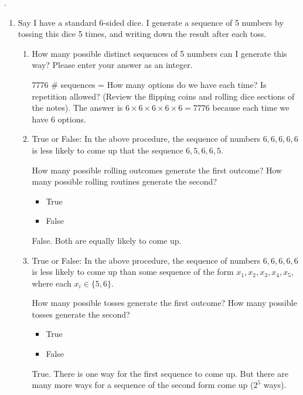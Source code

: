 \documentclass[11pt,preview]{standalone} %
\date{} %
\begin{document}
.


\begin{enumerate}
\item Say I have a standard 6-sided dice. I generate a sequence of 5 numbers by tossing this dice 5 times, and writing down the result after each toss. 
\begin{enumerate}
\item How many possible distinct sequences of 5 numbers can I generate this way? Please enter your answer as an integer.
\begin{Freeform}{7776}
\# sequences = 
\Hint How many options do we have each time? Is repetition allowed? (Review the flipping coins and rolling dice sections of the notes).
\Solution The answer is $6\times 6\times 6\times 6\times 6= 7776$ because each time we have $6$ options. 
\end{Freeform}
\item True or False: In the above procedure, the sequence of numbers $6, 6, 6, 6, 6$ is less likely to come up that the sequence $6, 5, 6, 6, 5$.
\begin{Choices}
\Hint How many possible rolling outcomes generate the first outcome? How many possible rolling routines generate the second?
\begin{itemize}
\FalseChoice\item True 
\TrueChoice\item False
\end{itemize}
\Solution False. Both are equally likely to come up.
\end{Choices}
\item True or False: In the above procedure, the sequence of numbers $6, 6, 6, 6, 6$ is less likely to come up than some sequence of the form $x_1, x_2, x_3, x_4, x_5$, where each $x_i \in \{5,6\}$. 
\begin{Choices}
\Hint How many possible tosses generate the first outcome? How many possible tosses generate the second?
\begin{itemize}
\TrueChoice\item True 
\FalseChoice\item False
\end{itemize}
\Solution True. There is one way for the first sequence to come up. But there are many more ways for a sequence of the second form come up ($2^5$ ways).
\end{Choices}

\end{enumerate}
\end{enumerate}
\end{document}
